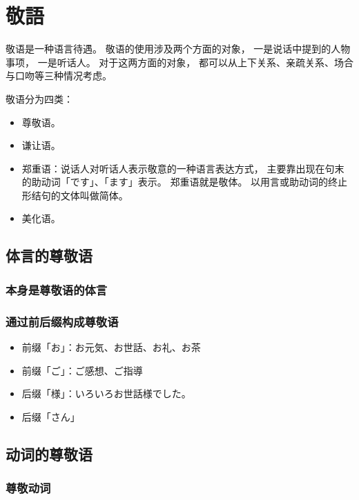 \section{敬語}%

敬语是一种语言待遇。
敬语的使用涉及两个方面的对象，
一是说话中提到的人物事项，
一是听话人。
对于这两方面的对象，
都可以从上下关系、亲疏关系、场合与口吻等三种情况考虑。

敬语分为四类：
\begin{itemize}
  \item 尊敬语。
  \item 谦让语。
  \item 郑重语：说话人对听话人表示敬意的一种语言表达方式，
    主要靠出现在句末的助动词「です」、「ます」表示。
    郑重语就是敬体。
    以用言或助动词的终止形结句的文体叫做简体。
  \item 美化语。
\end{itemize}


\subsection{体言的尊敬语}%

\subsubsection{本身是尊敬语的体言}%

\subsubsection{通过前后缀构成尊敬语}%

\begin{itemize}
  \item 前缀「お」：お元気、お世話、お礼、お茶
  \item 前缀「ご」：ご感想、ご指導
  \item 后缀「様」：いろいろお世話様でした。
  \item 后缀「さん」
\end{itemize}

\subsection{动词的尊敬语}%

\subsubsection{尊敬动词}%

